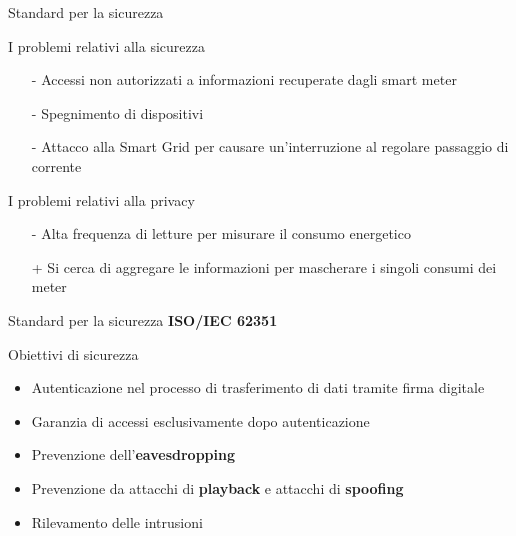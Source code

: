 

\begin{frame}{Standard per la sicurezza}
	\begin{block}{I problemi relativi alla sicurezza}
	\begin{itemize}
		\item[-] Accessi non autorizzati a informazioni recuperate dagli smart meter
		\item[-] Spegnimento di dispositivi
		\item[-] Attacco alla Smart Grid per causare un'interruzione al regolare passaggio di corrente
	\end{itemize}
	\end{block}		
	\pause
	\begin{block}{I problemi relativi alla privacy}
	\begin{itemize}
		\item[-] Alta frequenza di letture per misurare il consumo energetico
		\item[+] Si cerca di aggregare le informazioni per mascherare i singoli consumi dei meter
	\end{itemize}
	\end{block}		
\end{frame}

\begin{frame}{Standard per la sicurezza}
\textbf{ISO/IEC 62351}
\begin{block}{Obiettivi di sicurezza}
\begin{itemize}[<+- | alert@+>]
	\item Autenticazione nel processo di trasferimento di dati tramite firma digitale
	\item Garanzia di accessi esclusivamente dopo autenticazione
	\item Prevenzione dell'\textbf{\color{blue_slides}eavesdropping}
	\item Prevenzione da attacchi di \textbf{\color{blue_slides}playback} e attacchi di \textbf{\color{blue_slides}spoofing}
	\item Rilevamento delle intrusioni
\end{itemize}
\end{block}
\end{frame}


